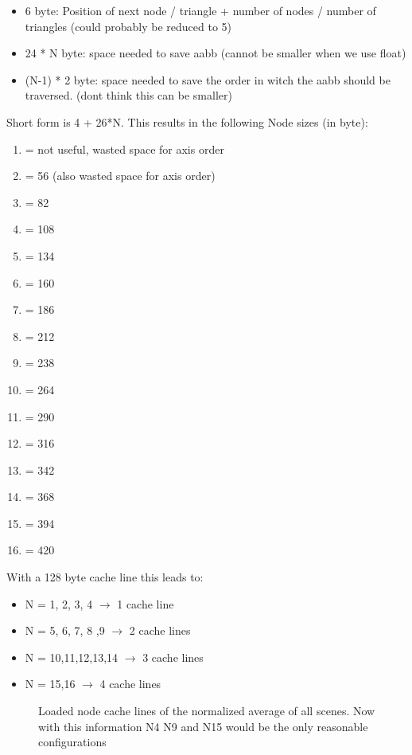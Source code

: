 \begin{itemize}
	\item 6 byte: Position of next node / triangle + number of nodes / number of triangles (could probably be reduced to 5)
	\item 24 * N byte: space needed to save aabb (cannot be smaller when we use float)
	\item (N-1) * 2 byte: space needed to save the order in witch the aabb should be traversed. (dont think this can be smaller)
\end{itemize}
Short form is 4 + 26*N.
This results in the following Node sizes (in byte):
\begin{enumerate}[label=\arabic*]
	\item = not useful, wasted space for axis order
	\item = 56 (also wasted space for axis order)
	\item = 82
	\item = 108
	\item = 134
	\item = 160
	\item = 186
	\item = 212
	\item = 238
	\item = 264
	\item = 290
	\item = 316
	\item = 342
	\item = 368
	\item = 394
	\item = 420
	
\end{enumerate}

With a 128 byte cache line this leads to:
\begin{itemize}
	\item[] N = 1, 2, 3, 4 $\rightarrow$ 1 cache line
	\item[] N = 5, 6, 7, 8 ,9 $\rightarrow$ 2 cache lines
	\item[] N = 10,11,12,13,14 $\rightarrow$ 3 cache lines
	\item[] N = 15,16 $\rightarrow$ 4 cache lines
\end{itemize}

\fi


\iftrue
\begin{figure}[!htb]
	\begin{minipage}[t]{0.4\textwidth} 
	\end{minipage}\hfil \hfil
	\begin{minipage}[t]{0.4\textwidth}
	\end{minipage}
	
	\caption{Loaded node cache lines of the normalized average of all scenes. Now with this information N4 N9 and N15 would be the only reasonable configurations}
\end{figure}
\fi


